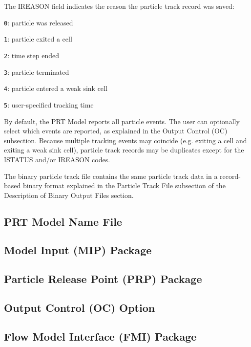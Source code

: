 The IREASON field indicates the reason the particle track record was saved:

\begin{description} \itemsep0pt \parskip0pt 
\item \texttt{0}: particle was released
\item \texttt{1}: particle exited a cell
\item \texttt{2}: time step ended
\item \texttt{3}: particle terminated
\item \texttt{4}: particle entered a weak sink cell
\item \texttt{5}: user-specified tracking time
\end{description}

By default, the PRT Model reports all particle events. The user can optionally select which events are reported, as explained in the Output Control (OC) subsection. Because multiple tracking events may coincide (e.g. exiting a cell and exiting a weak sink cell), particle track records may be duplicates except for the ISTATUS and/or IREASON codes.

The binary particle track file contains the same particle track data in a record-based binary format explained in the Particle Track File subsection of the Description of Binary Output Files section.





\newpage
\subsection{PRT Model Name File}


%

%

%

\newpage
\subsection{Model Input (MIP) Package}


\newpage
\subsection{Particle Release Point (PRP) Package}


\newpage
\subsection{Output Control (OC) Option}


\newpage
\subsection{Flow Model Interface (FMI) Package}

